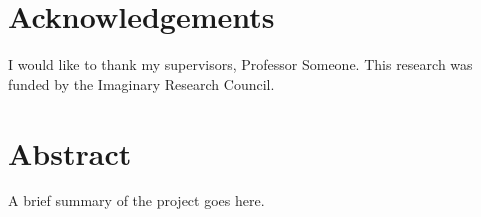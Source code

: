 \documentclass[
12pt,
a4paper, 
twoside,  %
openright, %
]{book}
\author{C.M.O.T Dibbler}
\begin{document}
	\frontmatter
	
	
	
	
	
	

	\printglossary[type=\acronymtype,title={Abbreviations}, style=alttree]
	\listoffigures
	\listoftables
	\tableofcontents

	\chapter{Acknowledgements}
	I would like to thank my supervisors, Professor Someone. This
	research was funded by the Imaginary Research Council.

	\chapter{Abstract}
	A brief summary of the project goes here.

	\mainmatter




\begin{appendices} 




\end{appendices} 

	\printindex

\end{document}
